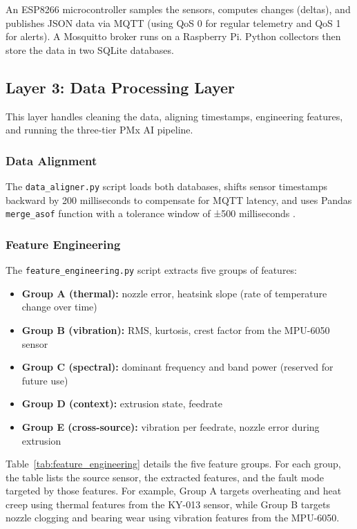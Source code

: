 An ESP8266 microcontroller samples the sensors, computes changes (deltas), and publishes JSON data via MQTT (using QoS 0 for regular telemetry and QoS 1 for alerts). A Mosquitto broker runs on a Raspberry Pi. Python collectors then store the data in two SQLite databases.

\subsection{Layer 3: Data Processing Layer}

This layer handles cleaning the data, aligning timestamps, engineering features, and running the three-tier PMx AI pipeline.

\subsubsection{Data Alignment}
The \verb|data_aligner.py| script loads both databases, shifts sensor timestamps backward by 200 milliseconds to compensate for MQTT latency, and uses Pandas \texttt{merge\_asof} function with a tolerance window of ±500 milliseconds \cite{mckinney2010data}.

\subsubsection{Feature Engineering}
The \verb|feature_engineering.py| script extracts five groups of features:

\begin{itemize}
    \item \textbf{Group A (thermal):} nozzle error, heatsink slope (rate of temperature change over time)
    \item \textbf{Group B (vibration):} RMS, kurtosis, crest factor from the MPU-6050 sensor
    \item \textbf{Group C (spectral):} dominant frequency and band power (reserved for future use)
    \item \textbf{Group D (context):} extrusion state, feedrate
    \item \textbf{Group E (cross-source):} vibration per feedrate, nozzle error during extrusion
\end{itemize}

Table~\ref{tab:feature_engineering} details the five feature groups. For each group, the table lists the source sensor, the extracted features, and the fault mode targeted by those features. For example, Group A targets overheating and heat creep using thermal features from the KY-013 sensor, while Group B targets nozzle clogging and bearing wear using vibration features from the MPU-6050.

